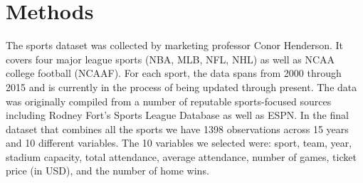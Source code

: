 \documentclass[man, fleqn, noextraspace,floatsintext]{apa6}
\newenvironment{Shaded}{\begin{snugshade}}{\end{snugshade}}
\newcommand{\KeywordTok}[1]{\textcolor[rgb]{0.13,0.29,0.53}{\textbf{#1}}}
\newcommand{\DataTypeTok}[1]{\textcolor[rgb]{0.13,0.29,0.53}{#1}}
\newcommand{\DecValTok}[1]{\textcolor[rgb]{0.00,0.00,0.81}{#1}}
\newcommand{\StringTok}[1]{\textcolor[rgb]{0.31,0.60,0.02}{#1}}
\newcommand{\CommentTok}[1]{\textcolor[rgb]{0.56,0.35,0.01}{\textit{#1}}}
\newcommand{\OperatorTok}[1]{\textcolor[rgb]{0.81,0.36,0.00}{\textbf{#1}}}
\newcommand{\NormalTok}[1]{#1}
\begin{document}
\begin{Shaded}
\end{Shaded}

\begin{Shaded}
\end{Shaded}

\section{Methods}\label{methods}

The sports dataset was collected by marketing professor Conor Henderson.
It covers four major league sports (NBA, MLB, NFL, NHL) as well as NCAA
college football (NCAAF). For each sport, the data spans from 2000
through 2015 and is currently in the process of being updated through
present. The data was originally compiled from a number of reputable
sports-focused sources including Rodney Fort's Sports League Database as
well as ESPN. In the final dataset that combines all the sports we have
1398 observations across 15 years and 10 different variables. The 10
variables we selected were: sport, team, year, stadium capacity, total
attendance, average attendance, number of games, ticket price (in USD),
and the number of home wins.
\end{document}
